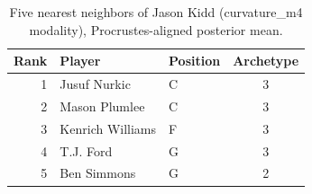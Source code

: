 \begin{table}[htbp]
  \centering\small
  \begin{tabular}{rllc}
    \toprule
    Rank & Player & Position & Archetype \\
    \midrule
    1 & Jusuf Nurkic & C & 3 \\
    2 & Mason Plumlee & C & 3 \\
    3 & Kenrich Williams & F & 3 \\
    4 & T.J. Ford & G & 3 \\
    5 & Ben Simmons & G & 2 \\
    \bottomrule
  \end{tabular}
  \caption{Five nearest neighbors of Jason Kidd (curvature_m4 modality), Procrustes-aligned posterior mean.}
  \label{tab:Jason_Kidd_neighbors_curvature_m4}
\end{table}

